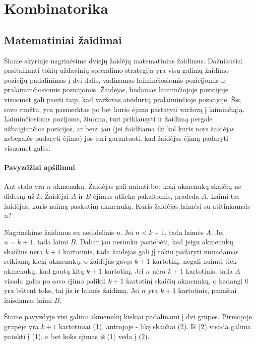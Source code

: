 \chapter{Kombinatorika}
\thispagestyle{empty}

\section{Matematiniai žaidimai}

Šiame skyriuje nagrinėsime dviejų žaidėjų matematinius žaidimus.
Dažniausiai pasitaikanti tokių uždavinių sprendimo strategija yra visų
galimų žaidimo pozicijų padalinimas į dvi dalis, vadinamas laiminčiosiomis
pozicijomis ir pralaiminčiosiomis pozicijomis. Žaidėjas, būdamas
laiminčiojoje pozicijoje visuomet gali paeiti taip, kad varžovas atsidurtų
pralaiminčioje pozicijoje. Šis, savo ruožtu, yra pasmerktas po bet kurio
ėjimo pastatyti varžovą į laiminčiąją. Laiminčiosioms pozijoms, žinoma,
turi priklausyti ir žaidimą pergale užbaigiančios pozicijos, ar bent jau (jei
žaidžiama iki kol kuris nors žaidėjas nebegalės padaryti ėjimo) jos turi
garantuoti, kad žaidėjas ėjimą padaryti visuomet galės. 


\subsubsection{Pavyzdžiai apšilimui}

\begin{pavnr}
  Ant stalo yra $n$ akmenukų. Žaidėjas gali nuimti bet kokį akmenukų skaičių
  ne didesnį už $k$. Žaidėjai $A$ ir $B$ ėjimus atlieka pakaitomis, pradeda $A$.
  Laimi tas žaidėjas, kuris nuimą paskutinį akmenuką. Kuris žaidėjas laimėsi
  su atitinkamais $n$?
\end{pavnr}

Nagrinėkime žaidimus su nedideliais $n$. Jei  $n<k+1$, tada laimės $A$. Jei $n =
k+1$, tada laimi $B$. Dabar jau nesunku pastebėti, kad jeigu akmenukų skaičius
nėra $k+1$ kartotinis, tada žaidėjas gali jį tokiu padaryti nuimdamas
reikiamą kiekį akmenukų, o žaidėjas gavęs  $k+1$ kartotinį, negali nuimti
tiek akmenukų, kad gautų kitą $k+1$ kartotinį. Jei $n$ nėra $k+1$
kartotinis, tada $A$ visada galės po savo ėjimo palikti $k+1$ kartotinį
skaičių akmenukų, o kadangi $0$ yra būtent toks, tai jis ir laimės žaidimą.
Jei $n$ yra $k+1$ kartotinis, panašiai žaisdamas laimi $B$. 

\begin{pastaba}Šiame pavyzdyje visi galimi akmenukų kiekiai padalinami į
  dvi grupes. Pirmojoje grupėje yra $k+1$ kartotiniai (1), antrojoje - likę
  skaičiai (2). Iš (2) visada galima patekti į (1), o bet koks ėjimas iš
  (1) veda į (2). 
\end{pastaba}

